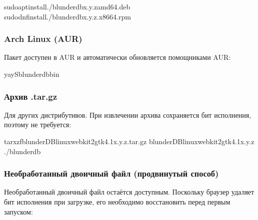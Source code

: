 \documentclass[letterpaper,10pt,russian]{sphinxmanual}
\begin{document}
\begin{sphinxVerbatim}[commandchars=\\\{\}]
sudoaptinstall./blunderdb\PYGZus{}x.y.z\PYGZus{}amd64.deb
sudodnfinstall./blunderdb\PYGZhy{}x.y.z.x86\PYGZus{}64.rpm
\end{sphinxVerbatim}


\subsubsection{Arch Linux (AUR)}
\label{\detokenize{telecharge_install:arch-linux-aur}}
\sphinxAtStartPar
Пакет  доступен в AUR и автоматически обновляется помощниками AUR:

\begin{sphinxVerbatim}[commandchars=\\\{\}]
yay\PYGZhy{}Sblunderdb\PYGZhy{}bin
\end{sphinxVerbatim}


\subsubsection{Архив .tar.gz}
\label{\detokenize{telecharge_install:archive-tar-gz}}
\sphinxAtStartPar
Для других дистрибутивов. При извлечении архива сохраняется бит исполнения, поэтому  не требуется:

\begin{sphinxVerbatim}[commandchars=\\\{\}]
tarxzfblunderDB\PYGZhy{}linux\PYGZhy{}webkit2gtk\PYGZhy{}4.1\PYGZhy{}x.y.z.tar.gz
blunderDB\PYGZhy{}linux\PYGZhy{}webkit2gtk\PYGZhy{}4.1\PYGZhy{}x.y.z
./blunderdb
\end{sphinxVerbatim}


\subsubsection{Необработанный двоичный файл (продвинутый способ)}
\label{\detokenize{telecharge_install:binaire-brut-methode-avancee}}
\sphinxAtStartPar
Необработанный двоичный файл  остаётся доступным. Поскольку браузер удаляет бит исполнения при загрузке, его необходимо восстановить перед первым запуском:
\end{document}
